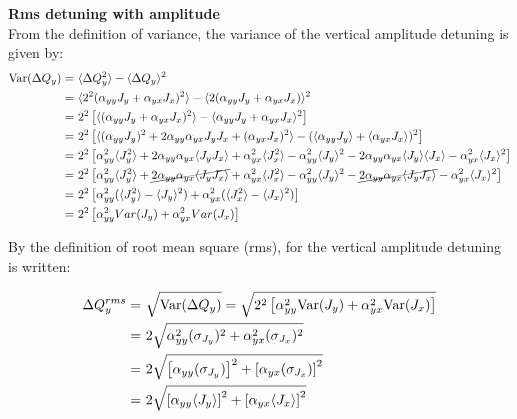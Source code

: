 \normalsize{\textbf{Rms detuning with amplitude}}\\
From the definition of variance, the variance of the vertical amplitude detuning is given by:
\begin{equation}\label{eq:var_amplDetuning}
    \begin{split}
        \mathrm{Var}(\Delta Q_y) = &~\langle \Delta Q_y ^2 \rangle - \langle \Delta Q_y \rangle ^2 \\
        = &~\langle 2^2 (\alpha_{yy} J_y + \alpha_{yx}J_x)^2 \rangle - \langle 2(\alpha_{yy}J_y + \alpha_{yx}J_x) \rangle^2 \\
        = &~2^2 \left [ \langle (\alpha_{yy} J_y + \alpha_{yx}J_x)^2 \rangle - \langle \alpha_{yy}J_y + \alpha_{yx}J_x \rangle^2 \right ] \\
         = &~2^2 \left [  \langle (\alpha_{yy} J_y)^2 + 2\alpha_{yy}\alpha_{yx}J_yJ_x + (\alpha_{yx} J_x)^2  \rangle - (\langle \alpha_{yy}J_y \rangle + \langle \alpha_{yx}J_x \rangle )^2 \right ]\\
         =&~2^2\left [ \alpha_{yy}^2 \langle J_y^2 \rangle + 2\alpha_{yy}\alpha_{yx} \langle J_yJ_x \rangle + \alpha_{yx}^2 \langle J_x^2 \rangle -\alpha_{yy}^2  \langle J_y \rangle^2 - 2\alpha_{yy} \alpha_{yx} \langle J_y \rangle \langle J_x \rangle - \alpha_{yx} ^2 \langle J_x \rangle^2 \right ]\\
         =&~2^2\left [ \alpha_{yy}^2 \langle J_y^2 \rangle + \cancel{2\alpha_{yy}\alpha_{yx} \langle J_yJ_x \rangle} + \alpha_{yx}^2 \langle J_x^2 \rangle -\alpha_{yy}^2  \langle J_y \rangle^2 - \cancel{2\alpha_{yy} \alpha_{yx} \langle J_y J_x \rangle} - \alpha_{yx} ^2 \langle J_x \rangle^2 \right ]\\
         =&~2^2\left [ \alpha_{yy}^2(\langle J_y^2\rangle - \langle J_y \rangle^2 ) + \alpha_{yx}^2(\langle J_x^2\rangle - \langle J_x \rangle^2 ) \right ]\\
         =&~2^2\left [ \alpha_{yy}^2 Var(J_y) + \alpha_{yx}^2 Var(J_x) \right ]
    \end{split}
\end{equation}

By the definition of root mean square (rms), for the vertical amplitude detuning is written:

\begin{equation}\label{rms_amplitude_detuning}
    \begin{split}
    \Delta Q^{rms}_y = &~\sqrt{\mathrm{Var}(\Delta Q_y)}=\sqrt{2^2\left [ \alpha_{yy}^2 \mathrm{Var}(J_y) + \alpha_{yx}^2 \mathrm{Var}(J_x) \right ]}\\
    =&~2 \sqrt{\alpha_{yy}^2 (\sigma_{J_y})^2 + \alpha_{yx}^2 (\sigma_{J_x})^2 }\\
    =&~2 \sqrt{\left [\alpha_{yy} (\sigma_{J_y})\right ]^2 + \left [ \alpha_{yx} (\sigma_{J_x}) \right ]^2 } \\
    =&~2 \sqrt{\left [\alpha_{yy} \langle {J_y} \rangle \right ]^2 + \left [ \alpha_{yx} \langle {J_x} \rangle \right ]^2 }
    \end{split}
\end{equation}

